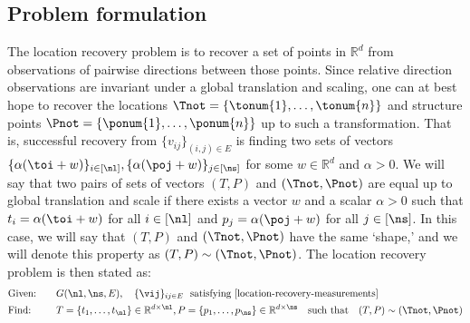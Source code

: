 \subsection{ Problem formulation}
The location recovery problem is to recover a set of points in $\mathbb{R}^d$ from observations of pairwise directions between those points. Since relative direction observations are invariant under a global translation and scaling, one can at best hope to recover the locations $\Tnot = \{ \tonum{1},\ldots, \tonum{n}\}$ and structure points $\Pnot = \{ \ponum{1},\ldots, \ponum{n}\}$ up to such a transformation. That is, successful recovery from $\{v_{ij}\}_{(i,j) \in E}$ is finding two sets  of vectors ${\{\alpha(\toi + w)\}_{i \in [\nl]}}, {\{\alpha(\poj + w)\}_{j \in [\ns]}}$ for some $w \in \mathbb{R}^d$ and $\alpha >0$. We will say that two pairs of sets of vectors $(T,P) $ and $(\Tnot,\Pnot)$ are equal up to global translation and scale if there exists a vector $w$ and a scalar $\alpha >0 $ such that $t_i = \alpha(\toi + w)$ for all $i \in [\nl]$ and $p_j = \alpha(\poj + w)$ for all $j \in [\ns]$.  In this case, we will say that $(T,P)$ and $(\Tnot,\Pnot)$ have the same `shape,' and we will denote this property as $(T,P) \sim (\Tnot,\Pnot)$. The location recovery problem is then stated as:
\begin{alignat*}{2}
&\text{Given:} &\quad &G(\nl,\ns,E), \quad \{\vij\}_{ij \in E} \text{\ \  satisfying \eqref{location-recovery-measurements} }\\
&\text{Find:} && T = \{t_1, \ldots, t_{\nl} \} \in \mathbb{R}^{d \times \nl}, P = \{p_1, \ldots, p_{\ns} \} \in \mathbb{R}^{d \times \ns} \quad \text{such that} \quad (T,P) \sim (\Tnot,\Pnot) %
\end{alignat*}


